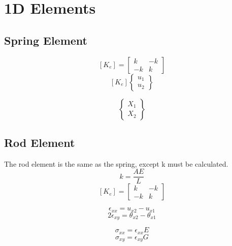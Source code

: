 \section{1D Elements}
   \subsection{Spring Element}
     \[ [K_e] = 
            \left[ \begin{array}{cc}
               k & -k \\
              -k &  k 
            \end{array}\right]\]
     \[ [K_e] \left\{ \begin{array}{c}  
              u_1 \\ u_2 \end{array}\right\} \]

         \[      \left\{ \begin{array}{c}
              X_1 \\ X_2 \end{array}\right\} \]
       
   \subsection{Rod Element}
     The rod element is the same as the spring, except k must be calculated.
       \[ k = \frac{AE}{L} \]
       \[ [K_e] = 
            \left[ \begin{array}{cc}
               k & -k \\
              -k &  k 
            \end{array}\right]\]
       
       \[   \epsilon_{xx} = u_{x2}-u_{x1}           \]
       \[ 2 \epsilon_{xy} = \theta_{x2}-\theta_{x1} \]

       \[ \sigma_{xx} = \epsilon_{xx} E \]
       \[ \sigma_{xy} = \epsilon_{xy} G \]


